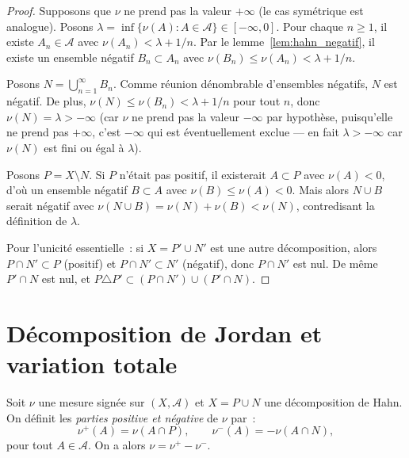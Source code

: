 \begin{proof}
Supposons que $\nu$ ne prend pas la valeur $+\infty$ (le cas sym\'etrique est analogue).
Posons $\lambda = \inf\{\nu(A) : A \in \mathcal{A}\} \in [-\infty, 0]$. Pour chaque
$n \geq 1$, il existe $A_n \in \mathcal{A}$ avec $\nu(A_n) < \lambda + 1/n$. Par
le lemme~\ref{lem:hahn_negatif}, il existe un ensemble n\'egatif $B_n \subset A_n$
avec $\nu(B_n) \leq \nu(A_n) < \lambda + 1/n$.

Posons $N = \bigcup_{n=1}^{\infty} B_n$. Comme r\'eunion d\'enombrable d'ensembles
n\'egatifs, $N$ est n\'egatif. De plus, $\nu(N) \leq \nu(B_n) < \lambda + 1/n$ pour
tout $n$, donc $\nu(N) = \lambda > -\infty$ (car $\nu$ ne prend pas la valeur $-\infty$
par hypoth\`ese, puisqu'elle ne prend pas $+\infty$, c'est $-\infty$ qui est \'eventuellement
exclue --- en fait $\lambda > -\infty$ car $\nu(N)$ est fini ou \'egal \`a $\lambda$).

Posons $P = X \setminus N$. Si $P$ n'\'etait pas positif, il existerait $A \subset P$
avec $\nu(A) < 0$, d'o\`u un ensemble n\'egatif $B \subset A$ avec $\nu(B) \leq \nu(A) < 0$.
Mais alors $N \cup B$ serait n\'egatif avec $\nu(N \cup B) = \nu(N) + \nu(B) < \nu(N)$,
contredisant la d\'efinition de $\lambda$.

Pour l'unicit\'e essentielle~: si $X = P' \cup N'$ est une autre d\'ecomposition, alors
$P \cap N' \subset P$ (positif) et $P \cap N' \subset N'$ (n\'egatif), donc $P \cap N'$
est nul. De m\^eme $P' \cap N$ est nul, et $P \triangle P' \subset (P \cap N') \cup (P' \cap N)$.
\end{proof}

\section{D\'ecomposition de Jordan et variation totale}

\begin{definition}
\label{def:jordan}
Soit $\nu$ une mesure sign\'ee sur $(X, \mathcal{A})$ et $X = P \cup N$ une
d\'ecomposition de Hahn. On d\'efinit les \emph{parties positive et n\'egative} de
$\nu$ par~:
\[
    \nu^+(A) = \nu(A \cap P), \qquad \nu^-(A) = -\nu(A \cap N),
\]
pour tout $A \in \mathcal{A}$. On a alors $\nu = \nu^+ - \nu^-$.
\end{definition}

